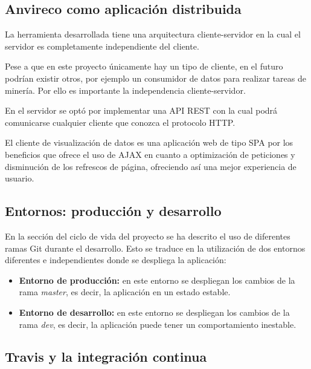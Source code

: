 \subsection{Anvireco como aplicación distribuida}

La herramienta desarrollada tiene una arquitectura cliente-servidor en la cual el servidor es completamente independiente del cliente.

Pese a que en este proyecto únicamente hay un tipo de cliente, en el futuro podrían existir otros, por ejemplo un consumidor de datos para realizar tareas de minería. Por ello es importante la independencia cliente-servidor.


En el servidor se optó por implementar una API REST con la cual podrá comunicarse cualquier cliente que conozca el protocolo HTTP.

El cliente de visualización de datos es una aplicación web de tipo SPA por los beneficios que ofrece el uso de AJAX en cuanto a optimización de peticiones y disminución de los refrescos de página, ofreciendo así una mejor experiencia de usuario.


\subsection{Entornos: producción y desarrollo}

En la sección del ciclo de vida del proyecto se ha descrito el uso de diferentes ramas Git durante el desarrollo. Esto se traduce en la utilización de dos entornos diferentes e independientes donde se despliega la aplicación:

\begin{itemize}
	\item \textbf{Entorno de producción:} en este entorno se despliegan los cambios de la rama \emph{master}, es decir, la aplicación en un estado estable.
	\item \textbf{Entorno de desarrollo:} en este entorno se despliegan los cambios de la rama \emph{dev}, es decir, la aplicación puede tener un comportamiento inestable.
\end{itemize}



\subsection{Travis y la integración continua}

